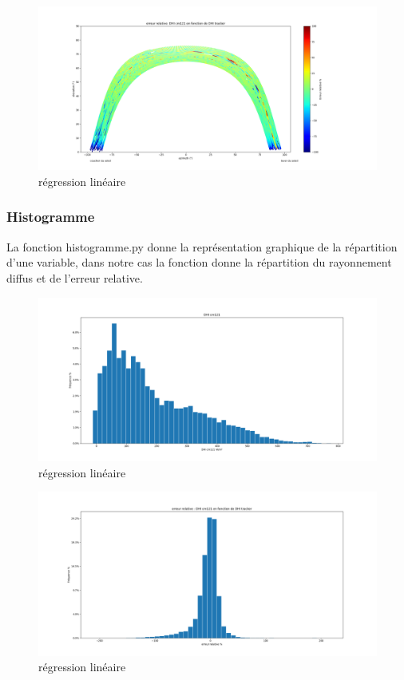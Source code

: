 \documentclass[12pt,a4paper]{article}
\begin{document}
\begin{flushleft}
\begin{figure}[H]
\centering
\includegraphics[width=15cm]{image/erreur_relative/1.png} 
\caption{régression linéaire}  
\end{figure}

\subsubsection{Histogramme}

La fonction histogramme.py donne la représentation graphique de la répartition d'une variable, dans notre cas la fonction donne la répartition du rayonnement diffus et de l'erreur relative.\\

\begin{figure}[H]
\centering
\includegraphics[width=15cm]{image/histogramme/1.png} 
\caption{régression linéaire}  
\end{figure}

\begin{figure}[H]
\centering
\includegraphics[width=15cm]{image/histogramme/2.png}  
\caption{régression linéaire}  
\end{figure}


\end{flushleft}
\end{document}
